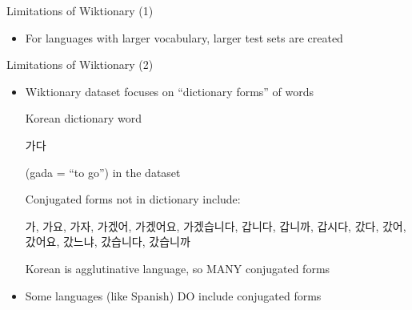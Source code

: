 \documentclass{beamer}
\begin{document}
\begin{frame}{Limitations of Wiktionary (1)}
\begin{itemize}
                    \vspace{0.15in}
                \item For languages with larger vocabulary, larger test sets are created



    \end{itemize}
\end{frame}

\begin{frame}{Limitations of Wiktionary (2)}
    \begin{itemize}
        \item Wiktionary dataset focuses on ``dictionary forms'' of words

            \vspace{0.15in}
            Korean dictionary word 
            \begin{CJK}{UTF8}{mj}
            가다
            \end{CJK} 
            (gada = ``to go'') in the dataset

            \vspace{0.15in}
            Conjugated forms not in dictionary include:

            \begin{CJK}{UTF8}{mj}
            가,
            가요,
            가자,
            가겠어,
            가겠어요,
            가겠습니다,
            갑니다,
            갑니까,
            갑시다,
            갔다,
            갔어,
            갔어요,
            갔느냐,
            갔습니다,
            갔습니까
            \end{CJK}

            \vspace{0.15in}
            Korean is agglutinative language, so MANY conjugated forms

            \vspace{0.15in}
        \item Some languages (like Spanish) DO include conjugated forms

    \end{itemize}
\end{frame}
\end{document}

